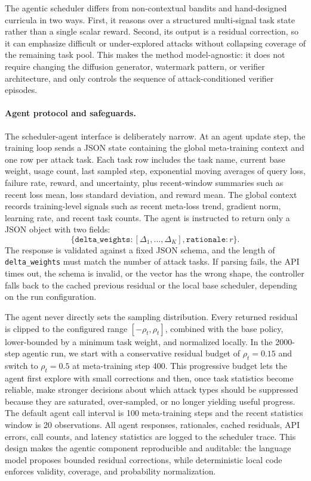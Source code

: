 The agentic scheduler differs from non-contextual bandits and hand-designed curricula in two ways.
First, it reasons over a structured multi-signal task state rather than a single scalar reward.
Second, its output is a residual correction, so it can emphasize difficult or under-explored attacks without collapsing coverage of the remaining task pool.
This makes the method model-agnostic: it does not require changing the diffusion generator, watermark pattern, or verifier architecture, and only controls the sequence of attack-conditioned verifier episodes.

\paragraph{Agent protocol and safeguards.}
The scheduler-agent interface is deliberately narrow.
At an agent update step, the training loop sends a JSON state containing the global meta-training context and one row per attack task.
Each task row includes the task name, current base weight, usage count, last sampled step, exponential moving averages of query loss, failure rate, reward, and uncertainty, plus recent-window summaries such as recent loss mean, loss standard deviation, and reward mean.
The global context records training-level signals such as recent meta-loss trend, gradient norm, learning rate, and recent task counts.
The agent is instructed to return only a JSON object with two fields:
\begin{equation}
    \{\texttt{delta\_weights}: [\Delta_1,\ldots,\Delta_K],
    \texttt{rationale}: r\}.
\end{equation}
The response is validated against a fixed JSON schema, and the length of \texttt{delta\_weights} must match the number of attack tasks.
If parsing fails, the API times out, the schema is invalid, or the vector has the wrong shape, the controller falls back to the cached previous residual or the local base scheduler, depending on the run configuration.

The agent never directly sets the sampling distribution.
Every returned residual is clipped to the configured range $[-\rho_t,\rho_t]$, combined with the base policy, lower-bounded by a minimum task weight, and normalized locally.
In the 2000-step agentic run, we start with a conservative residual budget of $\rho_t=0.15$ and switch to $\rho_t=0.5$ at meta-training step 400.
This progressive budget lets the agent first explore with small corrections and then, once task statistics become reliable, make stronger decisions about which attack types should be suppressed because they are saturated, over-sampled, or no longer yielding useful progress.
The default agent call interval is 100 meta-training steps and the recent statistics window is 20 observations.
All agent responses, rationales, cached residuals, API errors, call counts, and latency statistics are logged to the scheduler trace.
This design makes the agentic component reproducible and auditable: the language model proposes bounded residual corrections, while deterministic local code enforces validity, coverage, and probability normalization.

